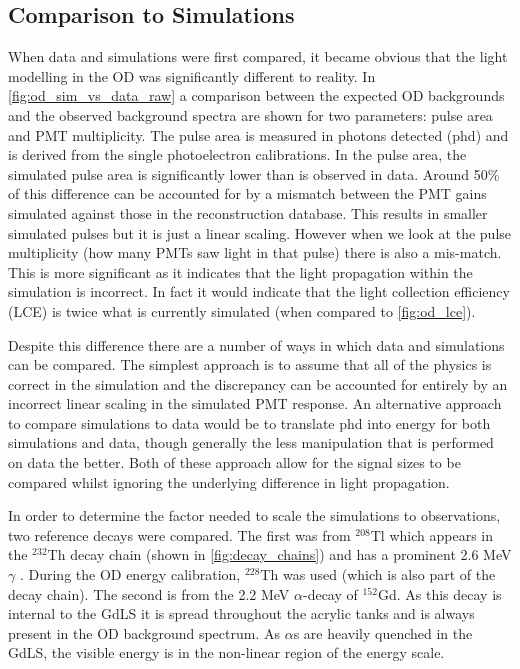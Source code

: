 

\subsection{Comparison to Simulations}
\par

When data and simulations were first compared, it became obvious that the light modelling in the OD was significantly different to reality.
In \autoref{fig:od_sim_vs_data_raw} a comparison between the expected OD backgrounds and the observed background spectra are shown for two parameters: pulse area and PMT multiplicity.
The pulse area is measured in photons detected (phd) and is derived from the single photoelectron calibrations.
In the pulse area, the simulated pulse area is significantly lower than is observed in data.
Around 50\% of this difference can be accounted for by a mismatch between the PMT gains simulated against those in the reconstruction database.
This results in smaller simulated pulses but it is just a linear scaling.
However when we look at the pulse multiplicity (how many PMTs saw light in that pulse) there is also a mis-match.
This is more significant as it indicates that the light propagation within the simulation is incorrect.
In fact it would indicate that the light collection efficiency (LCE) is twice what is currently simulated (when compared to \autoref{fig:od_lce}).



\par
Despite this difference there are a number of ways in which data and simulations can be compared.
The simplest approach is to assume that all of the physics is correct in the simulation and the discrepancy can be accounted for entirely by an incorrect linear scaling in the simulated PMT response.
An alternative approach to compare simulations to data would be to translate phd into energy for both simulations and data, though generally the less manipulation that is performed on data the better.
Both of these approach allow for the signal sizes to be compared whilst ignoring the underlying difference in light propagation.

\par
In order to determine the factor needed to scale the simulations to observations, two reference decays were compared.
The first was from ${}^{208}$Tl which appears in the ${}^{232}$Th decay chain (shown in \autoref{fig:decay_chains}) and has a prominent 2.6 MeV $\gamma$ \cite{radon_chains_ref}.
During the OD energy calibration, ${}^{228}$Th was used (which is also part of the decay chain).
The second is from the 2.2 MeV $\alpha$-decay of ${}^{152}$Gd.
As this decay is internal to the GdLS it is spread throughout the acrylic tanks and is always present in the OD background spectrum.
As $\alpha$s are heavily quenched in the GdLS, the visible energy is in the non-linear region of the energy scale.

